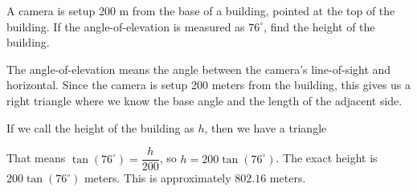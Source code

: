 \documentclass[nooutcomes]{ximera}
\begin{document}
\begin{example}
	
	A camera is setup 200 m from the base of a building, pointed at the top of the building. If the angle-of-elevation is measured as $76^\circ$, find the height of the building.
	
	\begin{explanation}
		
		The angle-of-elevation means the angle between the camera's line-of-sight and horizontal. Since the camera is setup 200 meters from the building, this gives us a right triangle where we know the
		base angle and the length of the adjacent side.
		
		If we call the height of the building as $h$, then we have a triangle
		\begin{image}[2in]
		\end{image}
		
		That means $\tan(76^\circ) = \dfrac{h}{200}$, so $h = 200 \tan(76^\circ)$. The exact height is $200 \tan(76^\circ)$ meters. This is approximately $802.16$ meters.

	\end{explanation}
\end{example}
\end{document}
